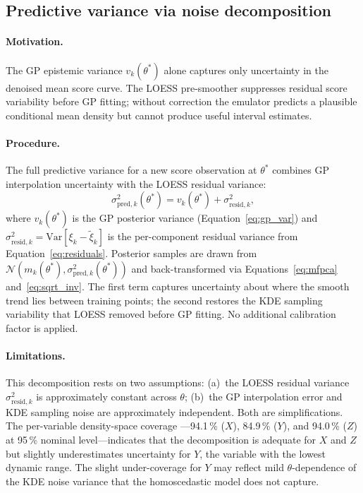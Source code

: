 \documentclass[12pt,a4paper]{article}
\newcommand{\spar}{\theta}
\begin{document}
\subsection{Predictive variance via noise decomposition}
\label{sec:noise_decomp}

\paragraph{Motivation.}
The GP epistemic variance $v_k(\spar^*)$ alone captures only
uncertainty in the denoised mean score curve.  The LOESS pre-smoother
suppresses residual score variability before GP fitting; without
correction the emulator predicts a plausible conditional mean density
but cannot produce useful interval estimates.

\paragraph{Procedure.}
The full predictive variance for a new score observation at $\spar^*$
combines GP interpolation uncertainty with the LOESS residual variance:
\begin{equation}
  \sigma^2_{\mathrm{pred},k}(\spar^*) =
  v_k(\spar^*)+\sigma^2_{\mathrm{resid},k},
  \label{eq:pred_var}
\end{equation}
where $v_k(\spar^*)$ is the GP posterior variance
(Equation~\ref{eq:gp_var}) and
$\sigma^2_{\mathrm{resid},k}=\mathrm{Var}[\xi_k-\tilde{\xi}_k]$ is the
per-component residual variance from Equation~\ref{eq:residuals}.
Posterior samples are drawn from
$\mathcal{N}(m_k(\spar^*),\sigma^2_{\mathrm{pred},k}(\spar^*))$ and
back-transformed via Equations~\eqref{eq:mfpca} and~\eqref{eq:sqrt_inv}.
The first term captures uncertainty about where the smooth trend lies
between training points; the second restores the KDE sampling
variability that LOESS removed before GP fitting.  No additional
calibration factor is applied.

\paragraph{Limitations.}
This decomposition rests on two assumptions:
(a)~the LOESS residual variance $\sigma^2_{\mathrm{resid},k}$ is
approximately constant across $\spar$;
(b)~the GP interpolation error and KDE sampling noise are approximately
independent.
Both are simplifications.  The per-variable density-space coverage
---94.1\,\% ($X$), 84.9\,\% ($Y$), and 94.0\,\% ($Z$) at 95\,\%
nominal level---indicates that the decomposition is adequate for $X$
and $Z$ but slightly underestimates uncertainty for $Y$, the variable
with the lowest dynamic range.  The slight under-coverage for $Y$ may
reflect mild $\spar$-dependence of the KDE noise variance that the
homoscedastic model does not capture.
\end{document}
